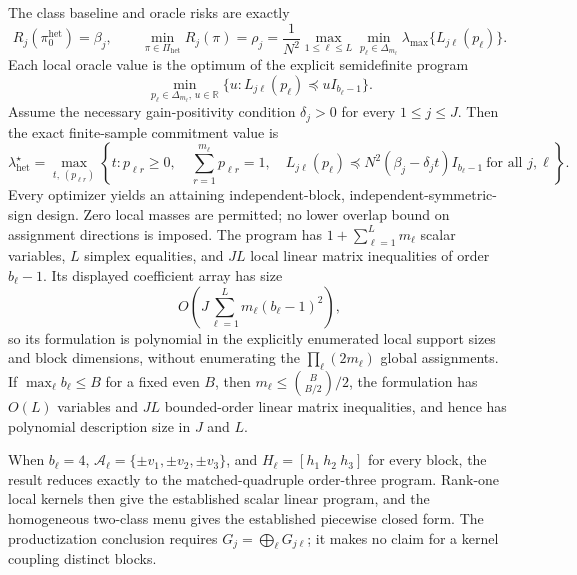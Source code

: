 The class baseline and oracle risks are exactly
\[
R_j(\pi_0^{\mathrm{het}})=\beta_j,
\qquad
\min_{\pi\in\Pi_{\mathrm{het}}}R_j(\pi)=\rho_j
=\frac1{N^2}\max_{1\le\ell\le L}
\min_{p_\ell\in\Delta_{m_\ell}}
\lambda_{\max}\{L_{j\ell}(p_\ell)\}.
\]
Each local oracle value is the optimum of the explicit semidefinite program
\[
\min_{p_\ell\in\Delta_{m_\ell},\,u\in\mathbb R}
\{u:L_{j\ell}(p_\ell)\preceq uI_{b_\ell-1}\}.
\]
Assume the necessary gain-positivity condition \(\delta_j>0\) for every \(1\le j\le J\).  Then the exact finite-sample commitment value is
\[
\boxed{
\lambda_{\mathrm{het}}^\star
=\max_{t,\,(p_{\ell r})}
\left\{t:
p_{\ell r}\ge0,\quad
\sum_{r=1}^{m_\ell}p_{\ell r}=1,\quad
L_{j\ell}(p_\ell)
\preceq N^2(\beta_j-\delta_jt)I_{b_\ell-1}
\ \text{for all }j,\ell
\right\}.}
\]
Every optimizer yields an attaining independent-block, independent-symmetric-sign design.  Zero local masses are permitted; no lower overlap bound on assignment directions is imposed.  The program has \(1+\sum_{\ell=1}^Lm_\ell\) scalar variables, \(L\) simplex equalities, and \(JL\) local linear matrix inequalities of order \(b_\ell-1\).  Its displayed coefficient array has size
\[
O\!\left(J\sum_{\ell=1}^Lm_\ell(b_\ell-1)^2\right),
\]
so its formulation is polynomial in the explicitly enumerated local support sizes and block dimensions, without enumerating the \(\prod_\ell(2m_\ell)\) global assignments.  If \(\max_\ell b_\ell\le B\) for a fixed even \(B\), then \(m_\ell\le\binom{B}{B/2}/2\), the formulation has \(O(L)\) variables and \(JL\) bounded-order linear matrix inequalities, and hence has polynomial description size in \(J\) and \(L\).

When \(b_\ell=4\), \(\mathcal A_\ell=\{\pm v_1,\pm v_2,\pm v_3\}\), and \(H_\ell=[h_1\ h_2\ h_3]\) for every block, the result reduces exactly to the matched-quadruple order-three program.  Rank-one local kernels then give the established scalar linear program, and the homogeneous two-class menu gives the established piecewise closed form.  The productization conclusion requires \(G_j=\bigoplus_\ell G_{j\ell}\); it makes no claim for a kernel coupling distinct blocks.